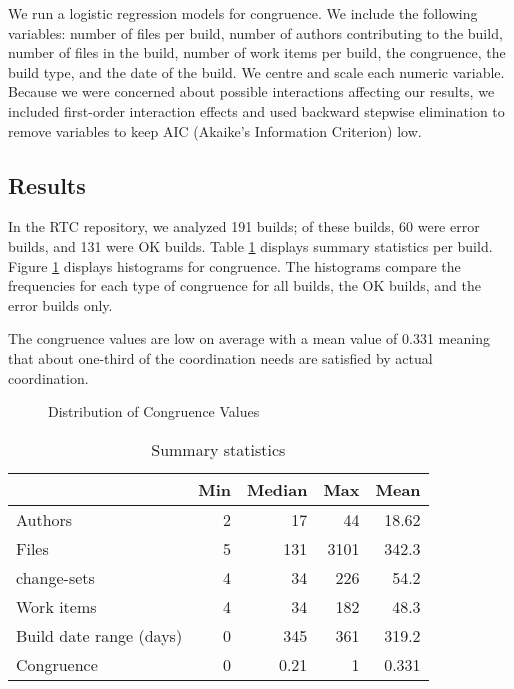 We run a logistic regression models for congruence. We include the following variables: number of files per build, number of authors contributing to the build, number of files in the build, number of work items per build, the congruence, the build type, and the date of the build. We centre and scale each numeric variable.
Because we were concerned about possible interactions affecting our results, we included first-order interaction effects and used backward stepwise elimination to remove variables to keep AIC (Akaike's Information Criterion) low.

\subsection{Results}
\label{sec:results}
In the RTC repository, we analyzed 191 builds; of these builds, 60 were error builds, and 131 were OK builds. Table \ref{tab:summary} displays summary statistics per build.
Figure \ref{fig:hist_unweighted_congruence} displays histograms for congruence. The histograms compare the frequencies for each type of congruence for all builds, the OK builds, and the error builds only.

The congruence values are low on average with a mean value of 0.331 meaning that about one-third of the coordination needs are satisfied by actual coordination.
\begin{figure}[t]
  \centering
	\caption{Distribution of Congruence Values}
	\label{fig:hist_unweighted_congruence}
\end{figure}

\begin{table}[t]
\centering
\begin{tabular}{lrrrr}
\toprule
 & Min & Median & Max & Mean\\\midrule
Authors & 2 & 17 & 44 & 18.62\\
Files & 5 & 131 & 3101 & 342.3 \\
change-sets & 4  & 34  & 226 & 54.2\\
Work items & 4 & 34  & 182 & 48.3 \\
Build date range (days) & 0  & 345  & 361 & 319.2 \\
Congruence & 0  & 0.21  & 1 & 0.331 \\
\bottomrule
\end{tabular}
\caption{Summary statistics}
\label{tab:summary}
\end{table}

